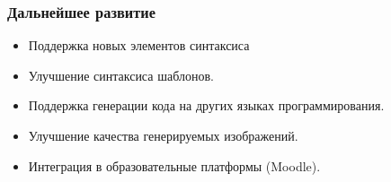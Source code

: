 \documentclass[14pt,aspectratio=169,hyperref={pdftex,unicode},xcolor=dvipsnames]{beamer}
\begin{document}




\begin{frame}
    \frametitle{Дальнейшее развитие}
    \begin{itemize}
        \item Поддержка новых элементов синтаксиса
        \item Улучшение синтаксиса шаблонов.
        \item Поддержка генерации кода на других языках программирования.
        \item Улучшение качества генерируемых изображений.
        \item Интеграция в образовательные платформы (Moodle).
    \end{itemize}
\end{frame}



\end{document}
